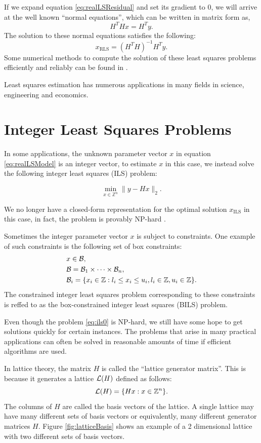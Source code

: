 \documentclass[12pt,Bold,letterpaper]{mcgilletdclass}
\newcommand{\be}{\begin{equation}}
\newcommand{\ee}{\end{equation}}
\newcommand{\boxcon}{{\cal B}}
\newcommand{\vsp}{\vspace{\baselineskip}}
\begin{document}
If we expand equation \eqref{eq:realLSResidual} and set its gradient to $0$, we will arrive at the
well known ``normal equations'', which can be written in matrix form as,
\begin{equation}
H^THx = H^Ty.
\label{eq:normalEquations}
\end{equation}
The solution to these normal equations satisfies the following:
$$x_{\scriptscriptstyle{\mathrm{RLS}}} = (H^TH)^{-1}H^Ty.$$
Some numerical methods to compute the solution of these least squares problems efficiently and reliably can be found in \cite{Bjo96}.

Least squares estimation has numerous applications in many fields in science, engineering and economics.

\vsp \section{Integer Least Squares Problems}
In some applications, the unknown parameter vector $x$ in equation \eqref{eq:realLSModel} is an integer vector, to estimate $x$ in this case, we instead solve the following integer least squares (ILS) problem:

\be
\label{eq:ils0}
\min_{x \in {\mathbb{Z}}^n}  \| y- Hx \|_2. 
\ee

We no longer have a closed-form representation for the optimal solution $x_{\scriptscriptstyle{\mathrm{ILS}}}$ in this case, in fact, the
problem is provably NP-hard \cite{Mic01}.  

Sometimes the integer parameter vector $x$ is subject to constraints. One example of such constraints is the following set of box constraints:
\begin{align} \label{eq:boxCon}
&x\in \boxcon,\\
&{\cal B} = {\cal B}_1  \times \cdots \times {\cal B}_n,\\
&\boxcon_i = \{x_i\in\mathbb{Z} : l_i\le x_i \le u_i, l_i\in \mathbb{Z},
u_i\in\mathbb{Z} \}.
\end{align}
The constrained integer least squares problem corresponding to these constraints is reffed to as the box-constrained integer least squares (BILS) problem. 

Even though the problem \eqref{eq:ils0} is NP-hard, we still have some hope to get solutions
quickly for certain instances. The problems that arise in many practical applications can often be solved in reasonable amounts of time if efficient algorithms are used.

In lattice theory, the matrix $H$ is called the ``lattice generator matrix''. This is because it generates a lattice ${\cal{L}}(H)$ defined as follows:
\begin{equation}
{\cal{L}}(H) = \{Hx: x\in \mathbb{Z}^n\}.
\end{equation}
The columns of $H$ are called the basis vectors of the lattice. A single lattice may have many different sets of basis vectors or equivalently, many different generator matrices $H$. Figure \ref{fig:latticeBasis} shows an example of a 2 dimensional lattice with two different sets of basis vectors.
\end{document}

